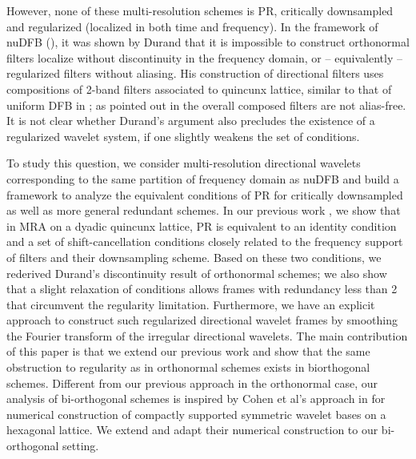 However, none of these multi-resolution schemes is PR, critically downsampled and regularized (localized in both time and frequency). In the framework of nuDFB (\cite{nuDFB05}), it was shown by Durand \cite{durand2007} that it is impossible to construct orthonormal filters localize without discontinuity in the frequency domain, or -- equivalently -- regularized filters without aliasing. His construction of directional filters uses compositions of 2-band filters associated to quincunx lattice, similar to that of uniform DFB in \cite{nuDFB05}; as pointed out in \cite{nuDFB05} the overall composed filters are not alias-free. It is not clear whether Durand's argument also precludes the existence of a regularized wavelet system, if one slightly weakens the set of conditions.

To study this question, we consider multi-resolution directional wavelets corresponding to the same partition of frequency domain as nuDFB and build a framework to analyze the equivalent conditions of PR for critically downsampled as well as more general redundant schemes. In our previous work \cite{yin2014orthshear}, we show that in MRA on a dyadic quincunx lattice, PR is equivalent to an identity condition and a set of shift-cancellation conditions closely related to the frequency support of filters and their downsampling scheme. Based on these two conditions, we rederived Durand's discontinuity result of orthonormal schemes; we also show that a slight relaxation of conditions allows frames with redundancy less than 2 that circumvent the regularity limitation. Furthermore, we have an explicit approach to construct such regularized directional wavelet frames by smoothing the Fourier transform of the irregular directional wavelets.
The main contribution of this paper is that we extend our previous work and show that the same obstruction to regularity as in orthonormal schemes exists in biorthogonal schemes. Different from our previous approach in the orthonormal case, our analysis of bi-orthogonal schemes is inspired by Cohen et al's approach in \cite{cohen1993compactly} for numerical construction of compactly supported symmetric wavelet bases on a hexagonal lattice. We extend and adapt their numerical construction to our bi-orthogonal setting.

